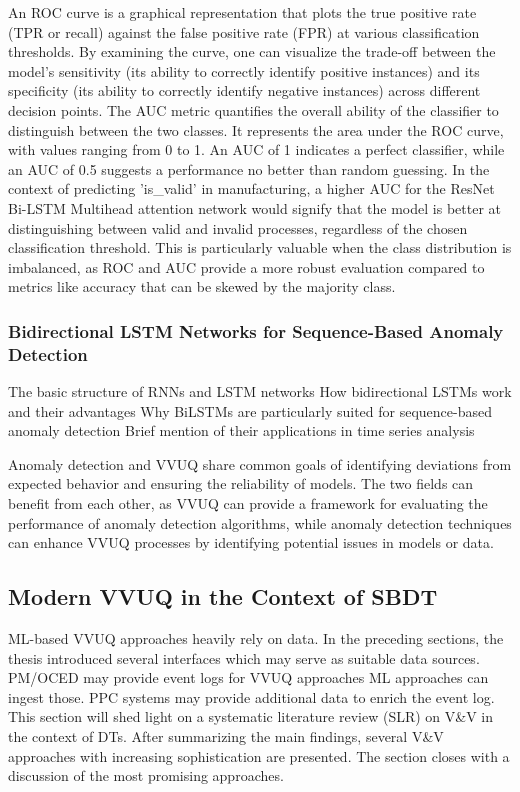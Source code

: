 An ROC curve is a graphical representation that plots the true positive rate (TPR or recall) against the false positive rate (FPR) at various classification thresholds. By examining the curve, one can visualize the trade-off between the model's sensitivity (its ability to correctly identify positive instances) and its specificity (its ability to correctly identify negative instances) across different decision points. The AUC metric quantifies the overall ability of the classifier to distinguish between the two classes. It represents the area under the ROC curve, with values ranging from 0 to 1. An AUC of 1 indicates a perfect classifier, while an AUC of 0.5 suggests a performance no better than random guessing. In the context of predicting 'is\_valid' in manufacturing, a higher AUC for the ResNet Bi-LSTM Multihead attention network would signify that the model is better at distinguishing between valid and invalid processes, regardless of the chosen classification threshold. This is particularly valuable when the class distribution is imbalanced, as ROC and AUC provide a more robust evaluation compared to metrics like accuracy that can be skewed by the majority class.


\subsubsection*{Bidirectional LSTM Networks for Sequence-Based Anomaly Detection}
The basic structure of RNNs and LSTM networks
How bidirectional LSTMs work and their advantages
Why BiLSTMs are particularly suited for sequence-based anomaly detection
Brief mention of their applications in time series analysis

Anomaly detection and VVUQ share common goals of identifying deviations from expected behavior and ensuring the reliability of models. The two fields can benefit from each other, as VVUQ can provide a framework for evaluating the performance of anomaly detection algorithms, while anomaly detection techniques can enhance VVUQ processes by identifying potential issues in models or data.

\subsection{Modern VVUQ in the Context of SBDT}
\label{sec:vvuq-dt}
ML-based VVUQ approaches heavily rely on data. In the preceding sections, the thesis introduced several interfaces which may serve as suitable data sources. PM/OCED may provide event logs for VVUQ approaches \textemdash ML approaches can ingest those. PPC systems may provide additional data to enrich the event log. This section will shed light on a systematic literature review (SLR) on V&V in the context of DTs. After summarizing the main findings, several V&V approaches with increasing sophistication are presented. The section closes with a discussion of the most promising approaches.


